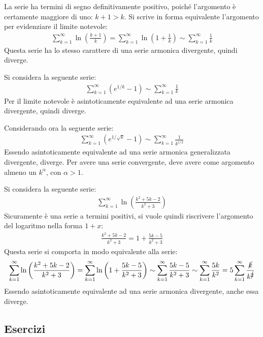 \documentclass{article}
\numberwithin{equation}{subsection}
\begin{document}
La serie ha termini di segno definitivamente positivo, poiché l'argomento è certamente maggiore di uno: $k+1>k$. Si scrive in forma equivalente l'argomento per evidenziare il limite notevole:
\begin{gather*}
    \displaystyle\sum_{k=1}^\infty\ln\left(\frac{k+1}{k}\right)=
    \displaystyle\sum_{k=1}^\infty\ln\left(1+\frac{1}{k}\right)\sim\sum_{k=1}^\infty\frac{1}{k}
\end{gather*}
Questa serie ha lo stesso carattere di una serie armonica divergente, quindi diverge. 

Si considera la seguente serie:
\begin{gather*}
    \displaystyle\sum_{k=1}^\infty\left(e^{1/k}-1\right)\sim\sum_{k=1}^\infty\frac{1}{k}
\end{gather*}
Per il limite notevole è asintoticamente equivalente ad una serie armonica divergente, quindi diverge. 

Considerando ora la seguente serie:
\begin{gather*}
    \displaystyle\sum_{k=1}^\infty\left(e^{1/\sqrt{k}}-1\right)\sim\sum_{k=1}^\infty\frac{1}{k^{1/2}}
\end{gather*}
Essendo asintoticamente equivalente ad una serie armonica generalizzata divergente, diverge. 
Per avere una serie convergente, deve avere come argomento almeno un $k^\alpha$, con $\alpha>1$. 


Si considera la seguente serie:
\begin{gather*}
    \displaystyle\sum_{k=1}^\infty\ln\left(\frac{k^2+5k-2}{k^2+3}\right)
\end{gather*}
Sicuramente è una serie a termini positivi, si vuole quindi riscrivere l'argomento del logaritmo nella forma $1+x$:
\begin{gather*}
    \displaystyle\frac{k^2+5k-2}{k^2+3}=1+\frac{5k-5}{k^2+3}
\end{gather*}
Questa serie si comporta in modo equivalente alla serie:
\begin{gather*}
    \displaystyle\sum_{k=1}^\infty\ln\left(\frac{k^2+5k-2}{k^2+3}\right)=
    \displaystyle\sum_{k=1}^\infty\ln\left(1+\frac{5k-5}{k^2+3}\right)\sim\sum_{k=1}^\infty\frac{5k-5}{k^2+3}\sim\sum_{k=1}^\infty\frac{5k}{k^2}=5\sum_{k=1}^\infty\frac{\cancel{k}}{k^{\cancel{2}}}
\end{gather*}
Essendo asintoticamente equivalente ad una serie armonica divergente, anche essa diverge. 

\subsection{Esercizi}
\end{document}
